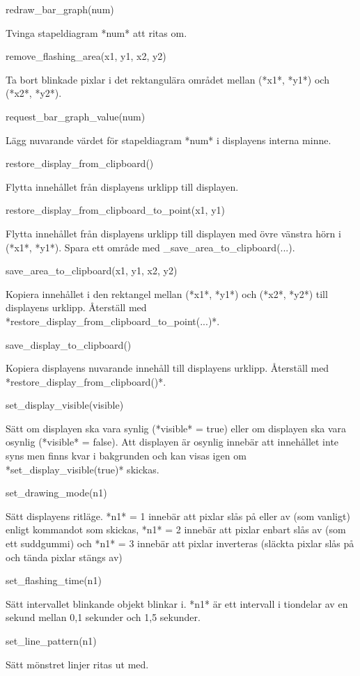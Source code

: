 \documentclass[10pt,oneside,swedish]{lips-no_customer}
\begin{document}
redraw\_bar\_graph(num)

Tvinga stapeldiagram *num* att ritas om.

remove\_flashing\_area(x1, y1, x2, y2)

Ta bort blinkade pixlar i det rektangulära området mellan (*x1*, *y1*)
och (*x2*, *y2*).

request\_bar\_graph\_value(num)

Lägg nuvarande värdet för stapeldiagram *num* i displayens interna
minne.

restore\_display\_from\_clipboard()

Flytta innehållet från displayens urklipp till displayen.

restore\_display\_from\_clipboard\_to\_point(x1, y1)

Flytta innehållet från displayens urklipp till displayen med övre
vänstra hörn i (*x1*, *y1*). Spara ett område med
\_save\_area\_to\_clipboard(...).

save\_area\_to\_clipboard(x1, y1, x2, y2)

Kopiera innehållet i den rektangel mellan (*x1*, *y1*) och (*x2*, *y2*)
till displayens urklipp. Återställ med
*restore\_display\_from\_clipboard\_to\_point(...)*.

save\_display\_to\_clipboard()

Kopiera displayens nuvarande innehåll till displayens urklipp. Återställ
med *restore\_display\_from\_clipboard()*.

set\_display\_visible(visible)

Sätt om displayen ska vara synlig (*visible* = true) eller om displayen
ska vara osynlig (*visible* = false). Att displayen är osynlig innebär
att innehållet inte syns men finns kvar i bakgrunden och kan visas igen
om *set\_display\_visible(true)* skickas.

set\_drawing\_mode(n1)

Sätt displayens ritläge. *n1* = 1 innebär att pixlar slås på eller av
(som vanligt) enligt kommandot som skickas, *n1* = 2 innebär att pixlar
enbart slås av (som ett suddgummi) och *n1* = 3 innebär att pixlar
inverteras (släckta pixlar slås på och tända pixlar stängs av)

set\_flashing\_time(n1)

Sätt intervallet blinkande objekt blinkar i. *n1* är ett intervall i
tiondelar av en sekund mellan 0,1 sekunder och 1,5 sekunder.

set\_line\_pattern(n1)

Sätt mönstret linjer ritas ut med.
\end{document}
